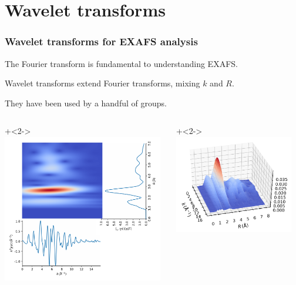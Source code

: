 \section{Wavelet transforms}

\begin{frame} \frametitle{Wavelet transforms for EXAFS analysis}

\begin{cenpage}{105mm}

  The Fourier transform is fundamental to understanding EXAFS.

  Wavelet transforms extend Fourier transforms, mixing $k$ and $R$.

  They have been used by a handful of groups.



\end{cenpage}

\begin{columns}
  \begin{column}[T]{70mm}

    {\onslide+<2->  \includegraphics[width=70mm]{figs/wavelets/wavelet_composite_mag}  }

  \end{column}

\begin{column}[T]{52mm}

  {\onslide+<2-> \includegraphics[width=52mm]{figs/wavelets/wavelet_surface} }


\end{column}
\end{columns}
\end{frame}
